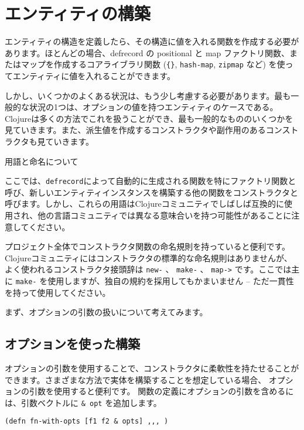 \section{エンティティの構築}


エンティティの構造を定義したら、その構造に値を入れる関数を作成する必要があります。ほとんどの場合、defrecord の positional と map ファクトリ関数、またはマップを作成するコアライブラリ関数 (\texttt{\{\}}, \texttt{hash-map}, \texttt{zipmap} など) を使ってエンティティに値を入れることができます。

しかし、いくつかのよくある状況は、もう少し考慮する必要があります。最も一般的な状況の1つは、オプションの値を持つエンティティのケースである。Clojureは多くの方法でこれを扱うことができ、最も一般的なもののいくつかを見ていきます。また、派生値を作成するコンストラクタや副作用のあるコンストラクタも見ていきます。

\begin{itembox}[l]{用語と命名について}

ここでは、\texttt{defrecord}によって自動的に生成される関数を特にファクトリ関数と呼び、新しいエンティティインスタンスを構築する他の関数をコンストラクタと呼びます。しかし、これらの用語はClojureコミュニティでしばしば互換的に使用され、他の言語コミュニティでは異なる意味合いを持つ可能性があることに注意してください。

プロジェクト全体でコンストラクタ関数の命名規則を持っていると便利です。Clojureコミュニティにはコンストラクタの標準的な命名規則はありませんが、よく使われるコンストラクタ接頭辞は \texttt{new-} 、 \texttt{make-} 、 \texttt{map->} です。ここでは主に \texttt{make-} を使用しますが、独自の規約を採用してもかまいません -- ただ一貫性を持って使用してください。
\end{itembox}

まず、オプションの引数の扱いについて考えてみます。

\subsection{オプションを使った構築}

オプションの引数を使用することで、コンストラクタに柔軟性を持たせることができます。さまざまな方法で実体を構築することを想定している場合、 オプションの引数を使用すると便利です。
関数の定義にオプションの引数を含めるには、引数ベクトルに \texttt{& opt} を追加します。


\begin{lstlisting}[numbers=none]
(defn fn-with-opts [f1 f2 & opts] ,,, )
\end{lstlisting}

